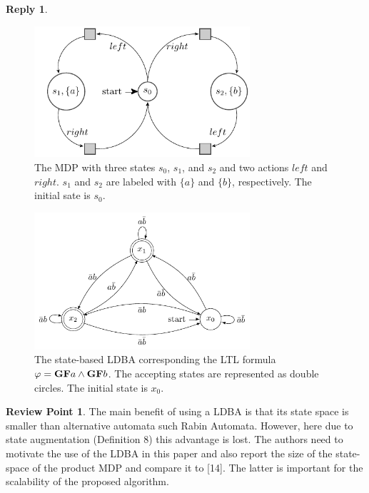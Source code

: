 \documentclass[10 pt, dvipdfmx]{article}
\theoremstyle{definition}
\newtheorem{review point}{Review Point}[section]
\newtheorem*{reply}{Reply}
\begin{document}
\begin{reply}
  \begin{figure}[H]
      \centering
      \includegraphics[width = 8cm]{reply_letter_MDP.pdf}
      \caption{The MDP with three states $s_0$, $s_1$, and $s_2$ and two actions $left$ and $right$. $s_1$ and $s_2$ are labeled with $\{ a \}$ and $\{ b \}$, respectively. The initial sate is $s_0$.}
      \label{MDP_counterexample}
  \end{figure}

  \begin{figure}[H]
     \centering
     \vspace{2mm}
     \includegraphics[width = 8cm]{reply_letter_LDBA.pdf}
     \caption{The state-based LDBA corresponding the LTL formula $\varphi = \text{{\bf GF}}a \land \text{{\bf GF}}b$. The accepting states are represented as double circles. The initial state is $x_0$.}
     \label{LDBA_counterexample}
  \end{figure}


\end{reply}

\begin{review point}
  The main benefit of using a LDBA is that its state space is smaller
than alternative automata such Rabin Automata. However, here due to
state augmentation (Definition 8) this advantage is lost. The authors
need to motivate the use of the LDBA in this paper and also report the
size of the state-space of the product MDP and compare it to [14]. The
latter is important for the scalability of the proposed algorithm.
\end{review point}
\end{document}
